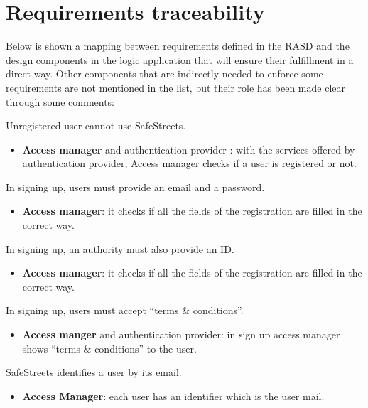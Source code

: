 \documentclass[../RASD.tex]{subfiles}
\begin{document}
    \chapter{Requirements traceability}\label{ch:requirements-traceability}
    Below is shown a mapping between requirements defined in the RASD and the design components in the logic application
    that will ensure their fulfillment in a direct way.
    Other components that are indirectly needed to enforce some requirements are not mentioned in the list,
    but their role has been made clear through some comments:
    \begin{enumerate}
         Unregistered user cannot use SafeStreets.
        \begin{itemize}
            \item \textbf{Access manager} and authentication provider : with the services offered by authentication provider,
            Access manager checks if a user is registered or not.
        \end{itemize}

         In signing up, users must provide an email and a password.
        \begin{itemize}
            \item \textbf{Access manager}: it checks if all the fields of the registration are filled in the correct way.
        \end{itemize}

         In signing up, an authority must also provide an ID\@.
        \begin{itemize}
            \item \textbf{Access manager}: it checks if all the fields of the registration are filled in the correct way.
        \end{itemize}

         In signing up, users must accept “terms \& conditions”.
        \begin{itemize}
            \item \textbf{Access manger} and authentication provider: in sign up access manager shows “terms \& conditions” to the user.
        \end{itemize}

         SafeStreets identifies a user by its email.
        \begin{itemize}
            \item \textbf{Access Manager}: each user has an identifier which is the user mail.
        \end{itemize}


\end{enumerate}
\end{document}
